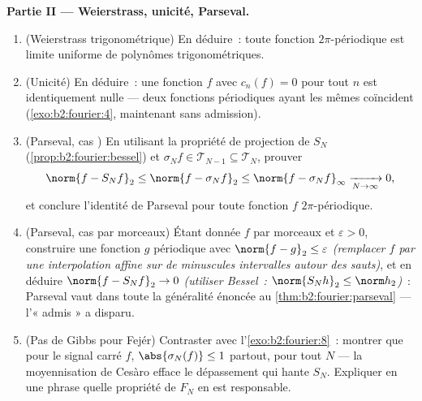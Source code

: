 \begin{problem}
\medskip
\noindent\textbf{Partie II --- Weierstrass, unicité, Parseval.}
\begin{enumerate}[resume]
  \item (Weierstrass trigonométrique) En déduire~: toute fonction
         $2\pi$-périodique est limite uniforme de
        polynômes trigonométriques.
  \item (Unicité) En déduire~: une fonction $f$  avec
        $c_n(f) = 0$ pour tout $n$ est identiquement nulle --- deux
        fonctions  périodiques ayant les mêmes
         coïncident (\cref{exo:b2:fourier:4},
        maintenant sans admission).
  \item (Parseval, cas ) En utilisant la propriété de
        projection de $S_N$ (\cref{prop:b2:fourier:bessel}) et
        $\sigma_Nf \in \mathcal T_{N-1} \subseteq \mathcal
        T_N$, prouver
        \[
        \norm{f - S_Nf}_2 \leq \norm{f - \sigma_Nf}_2
        \leq \norm{f - \sigma_Nf}_\infty
        \xrightarrow[N\to\infty]{} 0 ,
        \]
        et conclure l'identité de Parseval pour toute fonction $f$
        \emph{} $2\pi$-périodique.
  \item (Parseval, cas  par morceaux) Étant donnée $f$
         par morceaux et $\varepsilon > 0$, construire une
        fonction $g$  périodique avec $\norm{f - g}_2 \leq
        \varepsilon$ \emph{(remplacer $f$ par une interpolation
        affine sur de minuscules intervalles autour des sauts)}, et
        en déduire $\norm{f - S_Nf}_2 \to 0$
        \emph{(utiliser Bessel~: $\norm{S_Nh}_2 \leq \norm h_2$)}~:
        Parseval vaut dans toute la généralité énoncée au
        \cref{thm:b2:fourier:parseval} --- l'« admis » a disparu.
  \item (Pas de Gibbs pour Fejér) Contraster avec
        l'\cref{exo:b2:fourier:8}~: montrer que pour le signal carré
        $f$, $\abs{\sigma_N(f)} \leq 1$ partout, pour tout $N$ ---
        la moyennisation de Cesàro efface le dépassement qui hante
        $S_N$. Expliquer en une phrase quelle propriété de $F_N$ en
        est responsable.
\end{enumerate}


\end{problem}
